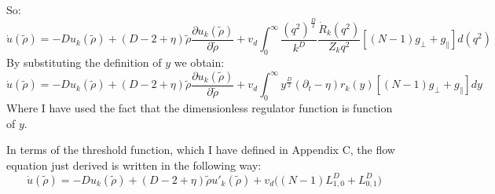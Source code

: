 So:
\begin{equation}
\dot{u}(\widetilde{\rho}) = -D  u_k(\widetilde{\rho}) +(D - 2 + \eta)\widetilde{\rho}\frac{\partial u_k(\widetilde{\rho})}{\partial \widetilde{\rho}} + v_d \int_0^\infty \frac{(q^2)^{\frac{D}{2}}}{k^D}  \frac{\dot{R}_k(q^2)}{Z_k q^2} \left[  (N-1)g_\perp   + g_\parallel \right] d(q^2) 
\end{equation}
By substituting the definition of $y $ we obtain:
\begin{equation}
\dot{u}(\widetilde{\rho}) = -D  u_k(\widetilde{\rho}) +(D - 2 + \eta)\widetilde{\rho}\frac{\partial u_k(\widetilde{\rho})}{\partial \widetilde{\rho}} + v_d \int_0^\infty y^{\frac{D}{2}}  (\partial_t - \eta) r_k(y) \left[ (N-1){g_\perp}  + g_\parallel \right] dy
\end{equation}
Where I have used the fact that the dimensionless regulator function is function of $y$.

In terms of the threshold function, which I have defined in Appendix C, the flow equation just derived is written in the following way:
\begin{equation}
 \dot{u}(\widetilde{\rho}) = -D  u_k(\widetilde{\rho}) +(D - 2 + \eta)\widetilde{\rho}u'_k(\widetilde{\rho}) + v_d \big((N - 1)L^D_{1,0} + L^D_{0,1} \big)
\end{equation}



